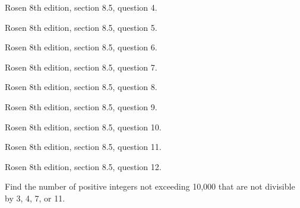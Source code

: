 \SOLUTION


\newpage
\nextq Rosen 8th edition, section 8.5, question 4.

\SOLUTION


\newpage
\nextq Rosen 8th edition, section 8.5, question 5.

\SOLUTION


\newpage
\nextq Rosen 8th edition, section 8.5, question 6.

\SOLUTION



\newpage
\nextq Rosen 8th edition, section 8.5, question 7.

\SOLUTION



\newpage
\nextq Rosen 8th edition, section 8.5, question 8.

\SOLUTION



\newpage
\nextq Rosen 8th edition, section 8.5, question 9.

\SOLUTION



\newpage
\nextq Rosen 8th edition, section 8.5, question 10.

\SOLUTION



\newpage
\nextq Rosen 8th edition, section 8.5, question 11.

\SOLUTION



\newpage
\nextq Rosen 8th edition, section 8.5, question 12.

\SOLUTION
Find the number of positive integers not exceeding
10,000 that are not divisible by 3, 4, 7, or 11.

